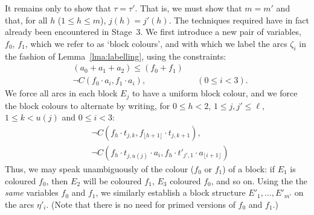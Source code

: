 \documentclass{article}
\newcommand{\md}[2][] {{\lfloor#2\rfloor_{#1}}}
\begin{document}
It remains only to show that $\tau = \tau'$.  That is, we must show
that $m = m'$ and that, for all $h$ ($1 \leq h \leq m$), $j(h) =
j'(h)$. The techniques required have in fact already been encountered
in Stage~3.  We first introduce a new pair of variables, $f_0$, $f_1$,
which we refer to as `block colours', and with which we label the arcs
$\zeta_i$ in the fashion of Lemma~\ref{lma:labelling}, using the
constraints:
\begin{align*}
& (a_0 + a_1 + a_2) \leq (f_0 + f_1)\\
& \neg C(f_0 \cdot a_i, f_1 \cdot a_i), & & (0 \leq i <3).
\end{align*}
We force all arcs in each block $E_j$ to have a uniform block colour,
and we force the block colours to alternate by writing, for $0 \leq h <2$,
$1 \leq j,j' \leq \ell$, $1 \leq k < u(j)$ and $0\leq i<3$:
\begin{align*}
& \neg C(f_h \cdot t_{j,k}, f_{\md{h+1}}\cdot t_{j,k+1}), \\& \neg C(f_h \cdot t_{j,u(j)}\cdot a_i, f_{h}\cdot t'_{j',1}\cdot a_{\md{i+1}}) \end{align*}
Thus, we may speak unambiguously of the colour ($f_0$ or $f_1$) of a
block: if $E_1$ is coloured $f_0$, then $E_2$ will be coloured $f_1$,
$E_3$ coloured $f_0$, and so on.  Using the the {\em same} variables
$f_0$ and $f_1$, we similarly establish a block structure $E'_1,
\ldots, E'_{m'}$ on the arcs $\eta'_i$. (Note that there is no need
for primed versions of $f_0$ and $f_1$.)
\end{document}
